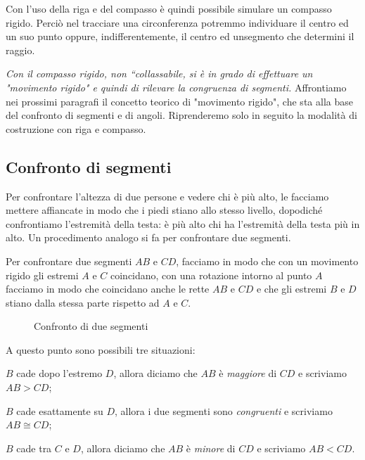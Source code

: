 Con l’uso della riga e del compasso è quindi possibile simulare un compasso rigido. 
Perciò nel tracciare una circonferenza potremmo individuare il centro ed un suo 
punto oppure, indifferentemente, il centro ed unsegmento che determini il 
raggio.

\textit{Con il compasso rigido, non “collassabile, si è in grado di effettuare un 
"movimento rigido" e quindi di rilevare la congruenza di segmenti.}
Affrontiamo nei prossimi paragrafi il concetto teorico di "movimento rigido", 
che sta alla base del confronto di segmenti e di angoli. Riprenderemo solo in 
seguito la modalità di costruzione con riga e compasso.

\subsection{Confronto di segmenti}

Per confrontare l'altezza di due persone e vedere chi è più alto, le 
facciamo mettere affiancate in modo che i piedi stiano allo stesso 
livello, dopodiché confrontiamo l'estremità della testa: è più alto 
chi ha l'estremità della testa più in alto. Un procedimento analogo 
si fa per confrontare due segmenti.

Per confrontare due segmenti $AB$ e $CD$, facciamo in modo che con un 
movimento rigido gli estremi $A$ e $C$ coincidano, con una rotazione 
intorno al punto $A$ facciamo in  modo che coincidano anche le rette 
$AB$ e $CD$ e che gli estremi $B$ e $D$ stiano dalla stessa parte 
rispetto ad $A$ e $C$.


\begin{inaccessibleblock}
 \begin{figure}[htb]
\centering
\caption{Confronto di due segmenti}
\end{figure}
\end{inaccessibleblock}

A questo punto sono possibili tre situazioni:
\begin{itemize*}
\item $B$ cade dopo l'estremo $D$, allora diciamo che $AB$ è 
\emph{maggiore} di $CD$ e scriviamo $AB>CD$;
\item $B$ cade esattamente su $D$, allora i due segmenti sono 
\emph{congruenti} e scriviamo $AB\cong CD$;
\item $B$ cade tra $C$ e $D$, allora diciamo che $AB$ è \emph{minore} 
di $CD$ e scriviamo $AB<CD$.
\end{itemize*}

